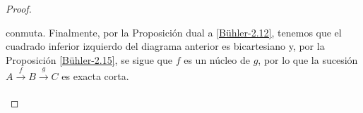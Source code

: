 \documentclass[tesis]{subfiles}
\begin{document}
\begin{proof}
\begin{enumerate}[label=(\alph*)]
             \begin{center}
             \end{center}
             conmuta. Finalmente, por la Proposición dual a \ref{Bühler-2.12}, tenemos que el cuadrado inferior izquierdo del diagrama anterior es bicartesiano y, por la Proposición \ref{Bühler-2.15}, se sigue que $f$ es un núcleo de $g$, por lo que la sucesión $A\xrightarrow[]{f}B\xrightarrow[]{g}C$ es exacta corta.
    \end{enumerate}
\end{proof}

%
%
%    
%
%
%
\end{document}
